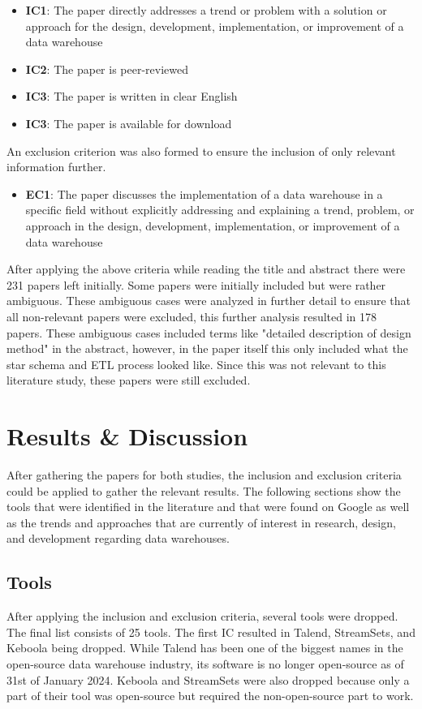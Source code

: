 \documentclass[11pt]{article}
\begin{document}
\begin{itemize}
    \item \textbf{IC1}: The paper directly addresses a trend or problem with a solution or approach for the design, development, implementation, or improvement of a data warehouse
    \item \textbf{IC2}: The paper is peer-reviewed
    \item \textbf{IC3}: The paper is written in clear English
    \item \textbf{IC3}: The paper is available for download
\end{itemize}

An exclusion criterion was also formed to ensure the inclusion of only relevant information further.
\begin{itemize}
    \item \textbf{EC1}: The paper discusses the implementation of a data warehouse in a specific field without explicitly addressing and explaining a trend, problem, or approach in the design, development, implementation, or improvement of a data warehouse
\end{itemize}

After applying the above criteria while reading the title and abstract there were 231 papers left initially. Some papers were initially included but were rather ambiguous. These ambiguous cases were analyzed in further detail to ensure that all non-relevant papers were excluded, this further analysis resulted in 178 papers. These ambiguous cases included terms like "detailed description of design method" in the abstract, however, in the paper itself this only included what the star schema and ETL process looked like. Since this was not relevant to this literature study, these papers were still excluded.\\

\section{Results \& Discussion}
\label{results}
After gathering the papers for both studies, the inclusion and exclusion criteria could be applied to gather the relevant results. The following sections show the tools that were identified in the literature and that were found on Google as well as the trends and approaches that are currently of interest in research, design, and development regarding data warehouses. \\

\subsection{Tools}
\label{results:tools}
After applying the inclusion and exclusion criteria, several tools were dropped. The final list consists of 25 tools. The first IC resulted in Talend, StreamSets, and Keboola being dropped. While Talend has been one of the biggest names in the open-source data warehouse industry, its software is no longer open-source as of 31st of January 2024. Keboola and StreamSets were also dropped because only a part of their tool was open-source but required the non-open-source part to work. \\
\end{document}
